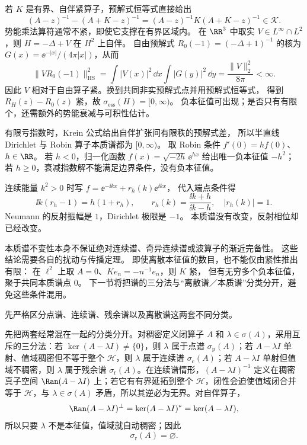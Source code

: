 \begin{example}[短程乘法势的相对紧性]
若 $K$ 是有界、自伴紧算子，预解式恒等式直接给出
\[
(A-z)^{-1}-(A+K-z)^{-1}
=(A-z)^{-1}K(A+K-z)^{-1}\in\mathcal K.
\]
势能乘法算符通常不紧，即使它支撑在有界区域内。
在 $\RR^3$ 中取实 $V\in L^\infty\cap L^2$，则 $H=-\Delta+V$ 在 $H^2$ 上自伴。
自由预解式 $R_0(-1)=(-\Delta+1)^{-1}$ 的核为
$G(x)=\ee^{-|x|}/(4\pi|x|)$，从而
\[
\|VR_0(-1)\|_{\mathrm{HS}}^2
=\int|V(x)|^2\,\dd x\int|G(y)|^2\,\dd y
=\frac{\|V\|_2^2}{8\pi}<\infty.
\]
因此 $V$ 相对于自由算子紧。换到共同非实预解式点并用预解式恒等式，
得到 $R_H(z)-R_0(z)$ 紧，故 $\sigma_{\mathrm{ess}}(H)=[0,\infty)$。
负本征值可出现；是否只有有限个，还需额外的势能衰减与可积性估计。
\end{example}

\begin{example}
有限亏指数时，Krein 公式给出自伴扩张间有限秩的预解式差，
所以半直线 Dirichlet 与 Robin 算子本质谱都为 $[0,\infty)$。
取 Robin 条件 $f'(0)=h f(0)$、$h\in\RR$。
若 $h<0$，归一化函数 $f(x)=\sqrt{-2h}\,\ee^{hx}$ 给出唯一负本征值 $-h^2$；
若 $h\ge0$，衰减指数解不能满足边界条件，没有负本征值。

连续能量 $k^2>0$ 时写 $f=\ee^{-\ii kx}+r_h(k)\ee^{\ii kx}$，
代入端点条件得
\[
\ii k(r_h-1)=h(1+r_h),\qquad
r_h(k)=\frac{\ii k+h}{\ii k-h},\quad |r_h(k)|=1.
\]
Neumann 的反射振幅是 $1$，Dirichlet 极限是 $-1$。
本质谱没有改变，反射相位却已经改变。
\end{example}

\begin{note}[本质谱不变不等于散射理论不变]
本质谱不变性本身不保证绝对连续谱、奇异连续谱或波算子的渐近完备性。
这些结论需要各自的扰动与传播定理。
即使离散本征值的数目，也不能仅由紧性推出有限：
在 $\ell^2$ 上取 $A=0$、$Ke_n=-n^{-1}e_n$，则 $K$ 紧，
但有无穷多个负本征值，聚于共同本质谱点 $0$。
下一节将把谱的三分法与“离散谱／本质谱”分类分开，避免这些条件混用。
\end{note}

先严格区分点谱、连续谱、残余谱以及离散谱这两套不同分类。

先把两套经常混在一起的分类分开。对稠密定义闭算子 $A$ 和 $\lambda\in\sigma(A)$，采用互斥的三分法：若
$\ker(A-\lambda I)\neq\{0\}$，则 $\lambda$ 属于点谱 $\sigma_{\mathrm p}(A)$；若
$A-\lambda I$ 单射、值域稠密但不等于整个 $\mathcal H$，则 $\lambda$ 属于连续谱 $\sigma_{\mathrm c}(A)$；若
$A-\lambda I$ 单射但值域不稠密，则 $\lambda$ 属于残余谱 $\sigma_{\mathrm r}(A)$。在连续谱情形，$(A-\lambda I)^{-1}$ 定义在稠密真子空间 $\Ran(A-\lambda I)$ 上；若它有有界延拓到整个 $\mathcal H$，闭性会迫使值域闭合并等于 $\mathcal H$，与 $\lambda\in\sigma(A)$ 矛盾，所以其逆必为无界。对自伴算子，
\[
 \Ran(A-\lambda I)^\perp
 =\ker(A-\lambda I)^*=
 \ker(A-\lambda I),
\]
所以只要 $\lambda$ 不是本征值，值域就自动稠密；因此
\begin{equation*}\sigma_{\mathrm r}(A)=\varnothing.
\end{equation*}

